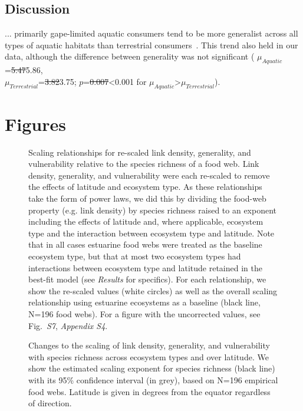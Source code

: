 \documentclass[12pt]{article}
\begin{document}
\begin{spacing}{2.0}
\subsection*{Discussion}

  ... primarily gape-limited aquatic consumers tend to be more
  generalist across all types of aquatic habitats than terrestrial 
  consumers~\cite{Liem1990,Shurin2006}. This trend also held in our data, although the difference between generality was not significant (
  $\mu_{Aquatic}$=\st{5.47}5.86, \\$\mu_{Terrestrial}$=\st{3.82}3.75; $p$=\st{0.007}\textless0.001 for $\mu_{Aquatic}$\textgreater$\mu_{Terrestrial}$). 

\end{spacing}




\newpage

\section*{Figures}


\begin{figure}[h]
\caption{
Scaling relationships for re-scaled link density, generality, and vulnerability 
relative to the species richness of a food web. Link density, generality,
and vulnerability were each re-scaled to remove the effects of latitude and ecosystem
type. As these relationships take the form of power laws, we did this by dividing the food-web
property (e.g. link density) by species richness raised to an exponent including the 
effects of latitude and, where applicable, ecosystem type and the interaction between ecosystem
type and latitude. Note that in all cases estuarine food webs were treated as the baseline 
ecosystem type, but that at most two ecosystem types had interactions between ecosystem type and
latitude retained in the best-fit model (see \emph{Results} for specifics). For each relationship, 
we show the re-scaled values (white circles) as well as the overall scaling relationship using estuarine
ecosystems as a baseline (black line, N=196 food webs). For a figure with the uncorrected values,
see Fig.~\emph{S7}, \emph{Appendix S4}.}
\label{props_v_lat}
\end{figure}


\begin{figure}[h]
\caption{Changes to the scaling of link density, generality, and vulnerability with species richness across ecosystem
types and over latitude. We show the estimated scaling exponent for species richness (black
line) with its 95\% confidence interval (in grey), based on N=196 empirical food webs.
Latitude is given in degrees from the equator regardless of direction.} \label{S} \end{figure}
\end{document}
